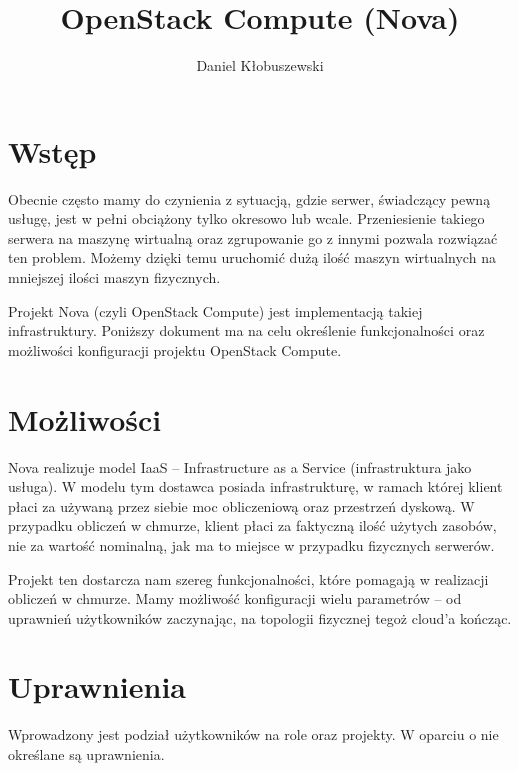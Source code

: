 

\usepackage{microtype}


\title{OpenStack Compute (Nova)\\[1em]
\large \sc {}}
\author{Daniel Kłobuszewski}


\maketitle

\section{Wstęp}
Obecnie często mamy do czynienia z sytuacją, gdzie serwer, świadczący pewną usługę, jest w pełni obciążony tylko okresowo lub wcale. Przeniesienie takiego serwera na maszynę wirtualną oraz zgrupowanie go z innymi pozwala rozwiązać ten problem. Możemy dzięki temu uruchomić dużą ilość maszyn wirtualnych na mniejszej ilości maszyn fizycznych.

Projekt Nova (czyli OpenStack Compute) jest implementacją takiej infrastruktury. Poniższy dokument ma na celu określenie funkcjonalności oraz możliwości konfiguracji projektu OpenStack Compute.

\section{Możliwości}
Nova realizuje model IaaS -- Infrastructure as a Service (infrastruktura jako usługa). W modelu tym dostawca posiada infrastrukturę, w ramach której klient płaci za używaną przez siebie moc obliczeniową oraz przestrzeń dyskową. W przypadku obliczeń w chmurze, klient płaci za faktyczną ilość użytych zasobów\cite{hansen11}, nie za wartość nominalną, jak ma to miejsce w przypadku fizycznych serwerów. 

Projekt ten dostarcza nam szereg funkcjonalności, które pomagają w realizacji obliczeń w chmurze. Mamy możliwość konfiguracji wielu parametrów -- od uprawnień użytkowników zaczynając, na topologii fizycznej tegoż cloud'a kończąc.

\section{Uprawnienia}

Wprowadzony jest podział użytkowników na role oraz projekty. W oparciu o nie określane są uprawnienia.

